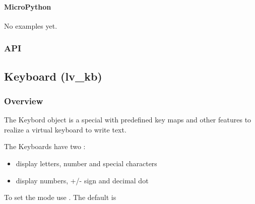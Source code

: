 \documentclass[letterpaper,10pt,english]{sphinxmanual}
\begin{document}
\begin{sphinxVerbatim}[commandchars=\\\{\}]
   
 

\end{sphinxVerbatim}


\paragraph{MicroPython}
\label{\detokenize{object-types/imgbtn:micropython}}
No examples yet.


\subsubsection{API}
\label{\detokenize{object-types/imgbtn:api}}

\subsection{Keyboard (lv\_kb)}
\label{\detokenize{object-types/kb:keyboard-lv-kb}}\label{\detokenize{object-types/kb::doc}}

\subsubsection{Overview}
\label{\detokenize{object-types/kb:overview}}
The Keybord object is a special {\hyperref[\detokenize{object-types/btnm::doc}]{}} with predefined key maps and other features to realize a virtual keyboard to write text.

The Keyboards have two :
\begin{itemize}
\item {} 
 display letters, number and special characters

\item {} 
 display numbers, +/- sign and decimal dot

\end{itemize}

To set the mode use . The default is  
\end{document}
